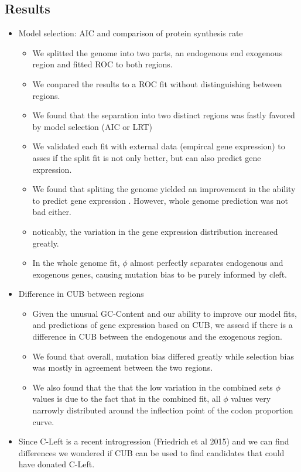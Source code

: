 \documentclass[12pt]{article}
\begin{document}
\subsection*{Results}
\begin{itemize}
	\item Model selection: AIC and comparison of protein synthesis rate 
	\begin{itemize}
		\item We splitted the genome into two parts, an endogenous end exogenous region and fitted ROC to both regions.
		\item We conpared the results to a ROC fit without distinguishing between regions.
		\item We found that the separation into two distinct regions was fastly favored by model selection (AIC or LRT)
		\item We validated each fit with external data (empircal gene expression) to asses if the split fit is not only better, but can also predict gene expression.
		\item We found that spliting the genome yielded an improvement in the ability to predict gene expression . However, whole genome prediction was not bad either.
		\item noticably, the variation in the gene expression distribution increased greatly.
		\item In the whole genome fit, $\phi$ almost perfectly separates endogenous and exogenous genes, causing mutation bias to be purely informed by cleft.
	\end{itemize}
	\item Difference in CUB between regions
	\begin{itemize}
		\item Given the unusual GC-Content and our ability to improve our model fits, and predictions of gene expression based on CUB, we assesd if there is a difference in CUB between the endogenous and the exogenous region.
		\item We found that overall, mutation bias differed greatly while selection bias was mostly in agreement between the two regions.
		\item We also found that the that the low variation in the combined sets $\phi$ values is due to the fact that in the combined fit, all $\phi$ values very narrowly distributed around the inflection point of the codon proportion curve.
	\end{itemize}
	\item Since C-Left is a recent introgression (Friedrich et al 2015) and we can find differences we wondered if CUB can be used to find candidates that could have donated C-Left.

\end{itemize}
\end{document}
